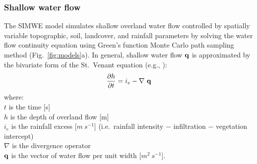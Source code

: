 \documentclass[gmd, manuscript]{copernicus}
\begin{document}


\subsubsection{Shallow water flow}

The SIMWE model simulates shallow overland water flow
controlled by spatially variable topographic, soil, landcover, 
and rainfall parameters by solving the water flow continuity equation 
using Green's function Monte Carlo path sampling method 
(Fig.~\ref{fig:models}a). 
In general, shallow water flow ${\bf q}$ is approximated by
the bivariate form of the St.~Venant equation (e.g., \citep{Julien1995}):
\begin{equation}
\label{eq:water}
{\partial h \over \partial t} =
 i_e - \nabla ~ {\bf q}
\end{equation}
{\small
\noindent
where: \\
\noindent
\hspace*{0.5em} $t$ is the time [\unit{s}] \\
\hspace*{0.5em} $h$ is the depth of overland flow [\unit{m}]\\
\hspace*{0.5em} $i_e$ is the rainfall excess [$\unit{m~s^{-1}}$]
(i.e.~rainfall intensity $-$ infiltration $-$ vegetation intercept)\\
\hspace*{0.5em} $\nabla$ is the divergence operator\\
\hspace*{0.5em} ${\bf q}$ is the vector of water flow per unit width [$\unit{m}^2~\unit{s}^{-1}$]. \\
}
\end{document}

